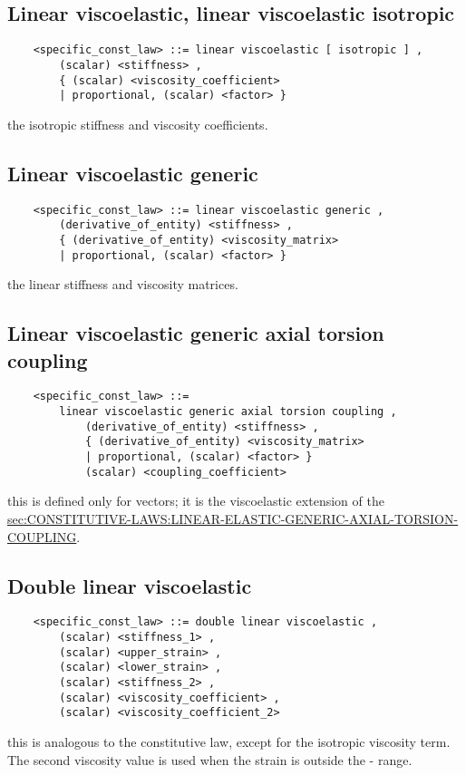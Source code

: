 \subsection{Linear viscoelastic, linear viscoelastic isotropic}
\begin{verbatim}
    <specific_const_law> ::= linear viscoelastic [ isotropic ] ,
        (scalar) <stiffness> ,
        { (scalar) <viscosity_coefficient>
        | proportional, (scalar) <factor> }
\end{verbatim}
the isotropic stiffness and viscosity coefficients.
  
\subsection{Linear viscoelastic generic}
\begin{verbatim}
    <specific_const_law> ::= linear viscoelastic generic ,  
        (derivative_of_entity) <stiffness> ,
        { (derivative_of_entity) <viscosity_matrix> 
        | proportional, (scalar) <factor> }
\end{verbatim}
the linear stiffness and viscosity matrices.
  
\subsection{Linear viscoelastic generic axial torsion coupling}
\begin{verbatim}
    <specific_const_law> ::= 
        linear viscoelastic generic axial torsion coupling ,  
            (derivative_of_entity) <stiffness> ,
            { (derivative_of_entity) <viscosity_matrix> 
            | proportional, (scalar) <factor> }
            (scalar) <coupling_coefficient>
\end{verbatim}
this is defined only for  vectors; it is the viscoelastic 
extension of the 
\hyperref{\kw{linear elastic generic axial torsion coupling} constitutive law}{\kw{linear elastic generic axial torsion coupling} constitutive law (see Section~}{)}{sec:CONSTITUTIVE-LAWS:LINEAR-ELASTIC-GENERIC-AXIAL-TORSION-COUPLING}.


\subsection{Double linear viscoelastic}
\begin{verbatim}
    <specific_const_law> ::= double linear viscoelastic ,
        (scalar) <stiffness_1> ,
        (scalar) <upper_strain> ,
        (scalar) <lower_strain> ,
        (scalar) <stiffness_2> ,
        (scalar) <viscosity_coefficient> ,
        (scalar) <viscosity_coefficient_2>
\end{verbatim}
this is analogous to the  constitutive law,
except for the isotropic viscosity term.
The second viscosity value is used when the strain is outside the
- range.

